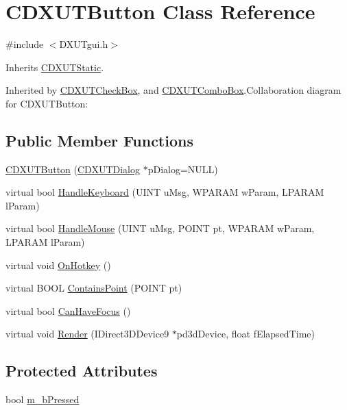 \hypertarget{class_c_d_x_u_t_button}{
\section{CDXUTButton Class Reference}
\label{class_c_d_x_u_t_button}
}


{\ttfamily \#include $<$DXUTgui.h$>$}

Inherits \hyperlink{class_c_d_x_u_t_static}{CDXUTStatic}.

Inherited by \hyperlink{class_c_d_x_u_t_check_box}{CDXUTCheckBox}, and \hyperlink{class_c_d_x_u_t_combo_box}{CDXUTComboBox}.Collaboration diagram for CDXUTButton:\subsection*{Public Member Functions}
\begin{DoxyCompactItemize}
\item 
\hyperlink{class_c_d_x_u_t_button_a05e8d838ea4ce93b2a7c70e78d41a95a}{CDXUTButton} (\hyperlink{class_c_d_x_u_t_dialog}{CDXUTDialog} $\ast$pDialog=NULL)
\item 
virtual bool \hyperlink{class_c_d_x_u_t_button_ae8da8eb3729b62ac3651eeca42d72530}{HandleKeyboard} (UINT uMsg, WPARAM wParam, LPARAM lParam)
\item 
virtual bool \hyperlink{class_c_d_x_u_t_button_ac0bb3da0b5cc77e4cadfbbed72d3e5b7}{HandleMouse} (UINT uMsg, POINT pt, WPARAM wParam, LPARAM lParam)
\item 
virtual void \hyperlink{class_c_d_x_u_t_button_ae63ba50da1c035a9aaa983bafd5eae97}{OnHotkey} ()
\item 
virtual BOOL \hyperlink{class_c_d_x_u_t_button_a2209ea24f5ba76d7506b368c80940172}{ContainsPoint} (POINT pt)
\item 
virtual bool \hyperlink{class_c_d_x_u_t_button_a81d210561344736cca99976a8c8e6d57}{CanHaveFocus} ()
\item 
virtual void \hyperlink{class_c_d_x_u_t_button_a75a837a8eca0777b51d3aac6de6d6144}{Render} (IDirect3DDevice9 $\ast$pd3dDevice, float fElapsedTime)
\end{DoxyCompactItemize}
\subsection*{Protected Attributes}
\begin{DoxyCompactItemize}
\item 
bool \hyperlink{class_c_d_x_u_t_button_ae60b08141abedf4b709e01ac6c8e6940}{m\_\-bPressed}
\end{DoxyCompactItemize}


